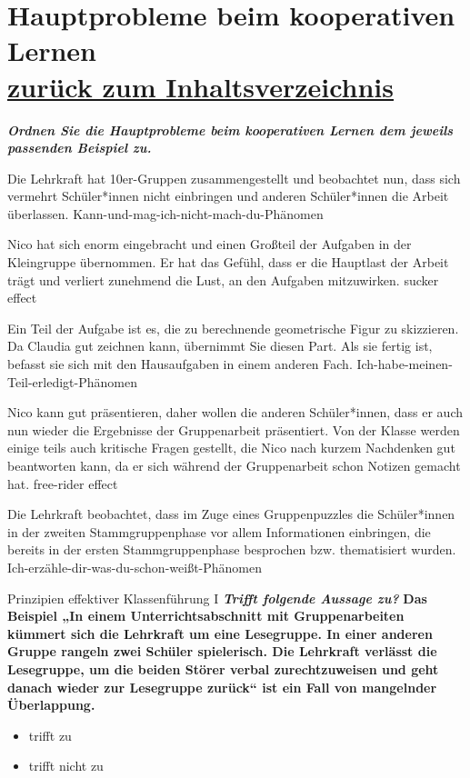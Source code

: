 \documentclass[a4paper]{article}
\newcommand{\TheCorrectAnswer}{\rlap{\hspace{1.4pt}$\bullet$}{$\ocircle$}}
\newcommand{\TheWrongAnswer}{$\ocircle$}
\newcommand{\defaultCorrect}{\ding{51}}
\newcommand{\defaultWrong}{\ding{55}}
\newcommand{\defaultUnsure}{\textbf{?}}
\newenvironment{answers}{\begin{itemize}}{\end{itemize}}
\newcommand{\correct}{\defaultCorrect}
\newcommand{\wrong}{\defaultWrong}
\newcommand{\unsure}{\defaultUnsure}
\newenvironment{question}[2]{%
    \section[#1 \normalfont(#2)]{#1\\\small\normalfont\hyperlink{tableofcontents}{zurück zum Inhaltsverzeichnis}}%
}{%
    \newpage%
}
\newcommand{\questiontext}[1]{\textbf{#1}}
\newcommand{\assignment}[1]{\textbf{\textit{#1}}\newline}
\newenvironment{single-choice}[1]{%
    \begin{question}{#1}{Single Choice}%
    \renewenvironment{answers}{%
        \begin{single-choice-list}}{\end{single-choice-list}%
    }%
    \renewcommand{\correct}{\TheCorrectAnswer}%
    \renewcommand{\wrong}{\TheWrongAnswer}%
    \renewcommand{\unsure}{TheUnsureAnswer}%
}{%
    \renewcommand{\correct}{\defaultCorrect}%
    \renewcommand{\wrong}{\defaultWrong}%
    \renewcommand{\unsure}{\defaultUnsure}%
    \end{question}%
}
\newenvironment{mapping}[1]{%
    \begin{question}{#1}{Zuordnungsaufgabe}%
    \newcommand{\ismappedto}{\tcblower}%
    \newenvironment{answer}{\begin{mapping-box}}{\end{mapping-box}}%
}{%
    \end{question}%
}
\begin{document}
\begin{mapping}{Hauptprobleme beim kooperativen Lernen}
    \assignment{Ordnen Sie die Hauptprobleme beim kooperativen Lernen dem jeweils passenden Beispiel zu.}
    \begin{answer}
        Die Lehrkraft hat 10er-Gruppen zusammengestellt und beobachtet nun, dass sich vermehrt Schüler*innen nicht einbringen und anderen Schüler*innen die Arbeit überlassen.
        \ismappedto
        Kann-und-mag-ich-nicht-mach-du-Phänomen
    \end{answer}
    \begin{answer}
        Nico hat sich enorm eingebracht und einen Großteil der Aufgaben in der Kleingruppe übernommen. Er hat das Gefühl, dass er die Hauptlast der Arbeit trägt und verliert zunehmend die Lust, an den Aufgaben mitzuwirken.
        \ismappedto
        sucker effect
    \end{answer}
    \begin{answer}
        Ein Teil der Aufgabe ist es, die zu berechnende geometrische Figur zu skizzieren. Da Claudia gut zeichnen kann, übernimmt Sie diesen Part. Als sie fertig ist, befasst sie sich mit den Hausaufgaben in einem anderen Fach.
        \ismappedto
        Ich-habe-meinen-Teil-erledigt-Phänomen
    \end{answer}
    \begin{answer}
        Nico kann gut präsentieren, daher wollen die anderen Schüler*innen, dass er auch nun wieder die Ergebnisse der Gruppenarbeit präsentiert. Von der Klasse werden einige teils auch kritische Fragen gestellt, die Nico nach kurzem Nachdenken gut beantworten kann, da er sich während der Gruppenarbeit schon Notizen gemacht hat.
        \ismappedto
        free-rider effect
    \end{answer}
    \begin{answer}
        Die Lehrkraft beobachtet, dass im Zuge eines Gruppenpuzzles die Schüler*innen in der zweiten Stammgruppenphase vor allem Informationen einbringen, die bereits in der ersten Stammgruppenphase besprochen bzw. thematisiert wurden.
        \ismappedto
        Ich-erzähle-dir-was-du-schon-weißt-Phänomen
    \end{answer}
\end{mapping}

\begin{single-choice}{Prinzipien effektiver Klassenführung I}
    \assignment{Trifft folgende Aussage zu?}
    \questiontext{Das Beispiel „In einem Unterrichtsabschnitt mit Gruppenarbeiten kümmert sich die Lehrkraft um eine Lesegruppe. In einer anderen Gruppe rangeln zwei Schüler spielerisch. Die Lehrkraft verlässt die Lesegruppe, um die beiden Störer verbal zurechtzuweisen und geht danach wieder zur Lesegruppe zurück“ ist ein Fall von mangelnder Überlappung.}
    \begin{answers}
        \item[\correct] trifft zu
        \item[\wrong] trifft nicht zu
    \end{answers}
\end{single-choice}
\end{document}
